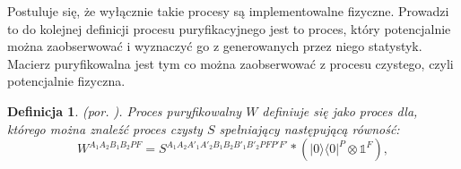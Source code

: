 \documentclass[10pt]{article} %
\newtheorem{definicja}{Definicja}
\DeclareMathOperator{\Trs}{Tr}
\newcommand{\Ket}[1]{|#1\rangle}
\newcommand{\Bra}[1]{\langle#1|}
\newcommand{\BBra}[1]{\langle\langle#1|}
\newcommand{\KKet}[1]{|#1\rangle\rangle}
\newcommand{\I}{\mathbb{1}}
\begin{document}
Postuluje się, że wyłącznie takie procesy są implementowalne fizyczne. Prowadzi to do kolejnej definicji procesu puryfikacyjnego jest to proces, który potencjalnie można zaobserwować i wyznaczyć go z generowanych przez niego statystyk. Macierz puryfikowalna jest tym co można zaobserwować z procesu czystego, czyli potencjalnie fizyczna.
\begin{definicja}
(por. \cite{purification}). Proces puryfikowalny $W$ definiuje się jako proces dla, którego można znaleźć proces czysty $S$ spełniający następującą równość:
\begin{equation}
\label{eq:purif}
W^{A_1A_2B_1B_2PF} = S^{A_1A_2A'_1A'_2B_1B_2B'_1B'_2PFP'F'} * \left( \Ket{0}\Bra{0}^P \otimes \I^F \right),
\end{equation}
\end{definicja}
\end{document}
